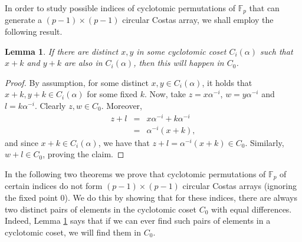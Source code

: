 \documentclass[10pt]{amsart}
\newtheorem{lemma}[theorem]{Lemma}
\begin{document}
In order to study possible indices of cyclotomic permutations of
$\mathbb{F}_p$ that can generate a $(p-1)\times(p-1)$ circular Costas array,
we shall employ the following result.


\begin{lemma}
\label{lemma:happen}
If there are distinct $x,y$ in some cyclotomic
coset $C_i(\alpha)$ such that $x+k$ and
$y+k$ are also in $C_i(\alpha)$, then this will happen in $C_0$.
\end{lemma}
\begin{proof}
By assumption, for some
distinct $x,y \in C_i(\alpha)$, it holds that $x+k,y+k \in C_i(\alpha)$ for
some fixed $k$.
Now, take $z=x\alpha^{-i}$, $w=y\alpha^{-i}$ and $l=k\alpha^{-i}$.
Clearly $z,w \in C_0$. Moreover,
\begin{eqnarray*}
z+l&=&x\alpha^{-i}+k\alpha^{-i}\\
&=&\alpha^{-i}(x+k),
\end{eqnarray*}
and since $x+k \in C_i(\alpha)$, we have that
$z+l=\alpha^{-i}(x+k) \in C_0$. Similarly,
$w+l \in C_0$, proving the claim.
\end{proof}

In the following two theorems we prove that cyclotomic
permutations of $\mathbb{F}_p$ of certain indices do not form
$(p-1) \times (p-1)$ circular Costas arrays (ignoring the fixed
point 0). We do this by showing that for these indices, there are
always two distinct pairs of elements in the cyclotomic coset
$C_0$ with equal differences. Indeed, Lemma \ref{lemma:happen}
says that if we can ever find such pairs of elements in a
cyclotomic coset, we will find them in $C_0$.
\end{document}
